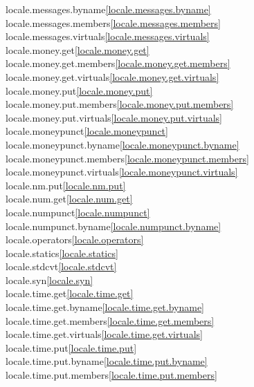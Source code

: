 \begin{multicols}{2}
locale.messages.byname\quad\ref{locale.messages.byname}\\
locale.messages.members\quad\ref{locale.messages.members}\\
locale.messages.virtuals\quad\ref{locale.messages.virtuals}\\
locale.money.get\quad\ref{locale.money.get}\\
locale.money.get.members\quad\ref{locale.money.get.members}\\
locale.money.get.virtuals\quad\ref{locale.money.get.virtuals}\\
locale.money.put\quad\ref{locale.money.put}\\
locale.money.put.members\quad\ref{locale.money.put.members}\\
locale.money.put.virtuals\quad\ref{locale.money.put.virtuals}\\
locale.moneypunct\quad\ref{locale.moneypunct}\\
locale.moneypunct.byname\quad\ref{locale.moneypunct.byname}\\
locale.moneypunct.members\quad\ref{locale.moneypunct.members}\\
locale.moneypunct.virtuals\quad\ref{locale.moneypunct.virtuals}\\
locale.nm.put\quad\ref{locale.nm.put}\\
locale.num.get\quad\ref{locale.num.get}\\
locale.numpunct\quad\ref{locale.numpunct}\\
locale.numpunct.byname\quad\ref{locale.numpunct.byname}\\
locale.operators\quad\ref{locale.operators}\\
locale.statics\quad\ref{locale.statics}\\
locale.stdcvt\quad\ref{locale.stdcvt}\\
locale.syn\quad\ref{locale.syn}\\
locale.time.get\quad\ref{locale.time.get}\\
locale.time.get.byname\quad\ref{locale.time.get.byname}\\
locale.time.get.members\quad\ref{locale.time.get.members}\\
locale.time.get.virtuals\quad\ref{locale.time.get.virtuals}\\
locale.time.put\quad\ref{locale.time.put}\\
locale.time.put.byname\quad\ref{locale.time.put.byname}\\
locale.time.put.members\quad\ref{locale.time.put.members}\\

\end{multicols}
